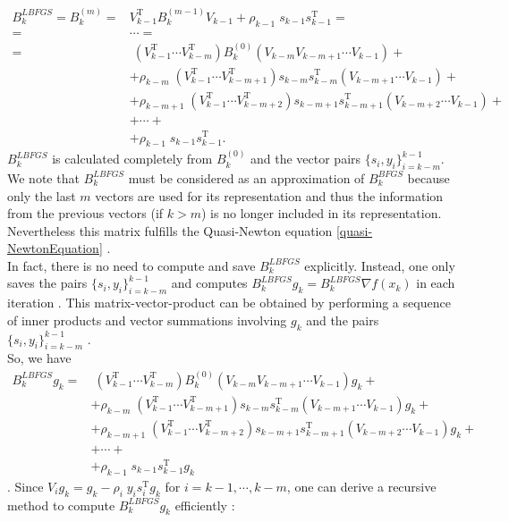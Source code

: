\begin{equation*}
    \begin{split}
        B^{LBFGS}_k = B^{(m)}_k = & V^{\mathrm{T}}_{k-1} B^{(m-1)}_k V_{k-1} + \rho_{k-1} \; s_{k-1} s_{k-1}^{\mathrm{T}}  = \\
        = & \cdots = \\
        = & \; (V^{\mathrm{T}}_{k-1} \cdots V^{\mathrm{T}}_{k-m}) B^{(0)}_k (V_{k-m} V_{k-m+1} \cdots V_{k-1}) + \\
        & + \rho_{k-m} \; (V^{\mathrm{T}}_{k-1} \cdots V^{\mathrm{T}}_{k-m+1}) s_{k-m} s^{\mathrm{T}}_{k-m} (V_{k-m+1} \cdots V_{k-1}) + \\
        & + \rho_{k-m+1} \; (V^{\mathrm{T}}_{k-1} \cdots V^{\mathrm{T}}_{k-m+2}) s_{k-m+1} s^{\mathrm{T}}_{k-m+1} (V_{k-m+2} \cdots V_{k-1}) +\\
        & + \cdots +\\
        & + \rho_{k-1} \; s_{k-1} s^{\mathrm{T}}_{k-1}.
    \end{split}
\end{equation*}
$B^{LBFGS}_k$ is calculated completely from $B^{(0)}_k$ and the vector pairs $\{ s_i, y_i\}_{i=k-m}^{k-1}$. We note that $B^{LBFGS}_k$ must be considered as an approximation of $B^{BFGS}_k$ because only the last $m$ vectors are used for its representation and thus the information from the previous vectors (if $k > m$) is no longer included in its representation. Nevertheless this matrix fulfills the Quasi-Newton equation \cref{quasi-NewtonEquation} \cite[p.~200]{GeigerKanzow:1999}. \\
In fact, there is no need to compute and save $B^{LBFGS}_k$ explicitly. Instead, one only saves the pairs $\{ s_i, y_i\}_{i=k-m}^{k-1}$ and computes $B^{LBFGS}_k g_k = B^{LBFGS}_k \nabla f(x_k)$ in each iteration \cite[p.~293]{SunYuan:2006}. This matrix-vector-product can be obtained by performing a sequence of inner products and vector summations involving $g_k$ and the pairs $\{ s_i, y_i\}_{i=k-m}^{k-1}$ \cite[p.~177]{NocedalWright:2006}. \\
So, we have 
\begin{equation*}
    \begin{split}
        B^{LBFGS}_k g_k = & \; (V^{\mathrm{T}}_{k-1} \cdots V^{\mathrm{T}}_{k-m})  B^{(0)}_k (V_{k-m} V_{k-m+1} \cdots V_{k-1}) g_k +\\
        & + \rho_{k-m} \; (V^{\mathrm{T}}_{k-1} \cdots V^{\mathrm{T}}_{k-m+1}) s_{k-m} s^{\mathrm{T}}_{k-m} (V_{k-m+1} \cdots V_{k-1}) g_k + \\
        & + \rho_{k-m+1} \; (V^{\mathrm{T}}_{k-1} \cdots V^{\mathrm{T}}_{k-m+2}) s_{k-m+1} s^{\mathrm{T}}_{k-m+1} (V_{k-m+2} \cdots V_{k-1}) g_k + \\
        & + \cdots + \\
        & + \rho_{k-1} \; s_{k-1} s^{\mathrm{T}}_{k-1} g_k
    \end{split}
\end{equation*}
\cite[p.~293]{SunYuan:2006}. Since $V_i g_k = g_k - \rho_i \; y_i s_i^{\mathrm{T}} g_k$ for $i = k-1, \cdots, k-m$, one can derive a recursive method to compute $B^{LBFGS}_k g_k$ efficiently \cite[p.~178]{NocedalWright:2006}:


